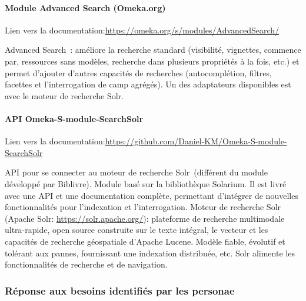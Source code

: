 \paragraph*{Module Advanced Search (Omeka.org)}

Lien vers la documentation:\url{https://omeka.org/s/modules/AdvancedSearch/}

Advanced Search : améliore la recherche standard (visibilité, vignettes, commence par, ressources sans modèles, recherche dans plusieurs propriétés à la fois, etc.) et permet d’ajouter d’autres capacités de recherches (autocomplétion, filtres, facettes et l’interrogation de camp agrégés). Un des adaptateurs disponibles est avec le moteur de recherche Solr.

\paragraph*{API Omeka-S-module-SearchSolr}

Lien vers la documentation:\url{https://github.com/Daniel-KM/Omeka-S-module-SearchSolr}
 
API pour se connecter au moteur de recherche Solr (différent du module développé par Biblivre).
Module basé sur la bibliothèque Solarium. Il est livré avec une API et une documentation complète, permettant d’intégrer de nouvelles fonctionnalités pour l’indexation et l’interrogation. 
Moteur de recherche Solr (Apache Solr: \url{https://solr.apache.org/}): plateforme de recherche multimodale ultra-rapide, open source construite sur le texte intégral, le vecteur et les capacités de recherche géospatiale d’Apache Lucene. Modèle fiable, évolutif et tolérant aux pannes, fournissant une indexation distribuée, etc. Solr alimente les fonctionnalités de recherche et de navigation.

\subsubsection{Réponse aux besoins identifiés par les personae}

